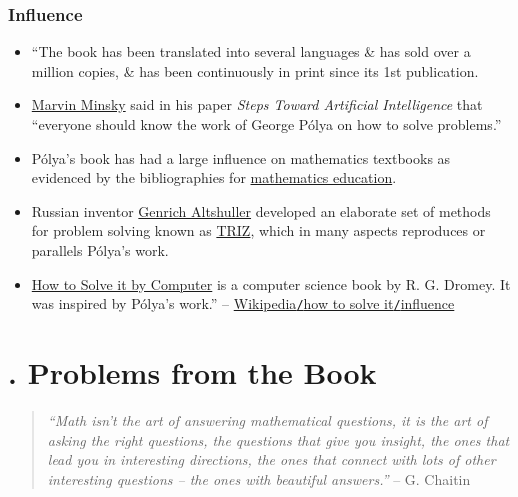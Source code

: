 \documentclass[oneside]{book}
\numberwithin{equation}{section}
\begin{document}
\subsection{Influence}
\begin{itemize}
	\item ``The book has been translated into several languages \& has sold over a million copies, \& has been continuously in print since its 1st publication.
	\item \href{https://en.wikipedia.org/wiki/Marvin_Minsky}{Marvin Minsky} said in his paper \textit{Steps Toward Artificial Intelligence} that ``everyone should know the work of George P\'olya on how to solve problems.''
	\item P\'olya's book has had a large influence on mathematics textbooks as evidenced by the bibliographies for \href{https://en.wikipedia.org/wiki/Mathematics_education}{mathematics education}.
	\item Russian inventor \href{https://en.wikipedia.org/wiki/Genrich_Altshuller}{Genrich Altshuller} developed an elaborate set of methods for problem solving known as \href{https://en.wikipedia.org/wiki/TRIZ}{TRIZ}, which in many aspects reproduces or parallels P\'olya's work.
	\item \href{https://en.wikipedia.org/wiki/How_to_Solve_it_by_Computer}{How to Solve it by Computer} is a computer science book by R. G. Dromey. It was inspired by P\'olya's work.'' -- \href{https://en.wikipedia.org/wiki/How_to_Solve_It#Influence}{Wikipedia\texttt{/}how to solve it\texttt{/}influence}
\end{itemize}


\chapter{\cite{Andreescu_Dospinescu2010}. Problems from the Book}

\begin{quotation}
	\textit{``Math isn't the art of answering mathematical questions, it is the art of asking the right questions, the questions that give you insight, the ones that lead you in interesting directions, the ones that connect with lots of other interesting questions -- the ones with beautiful answers.''} -- G. Chaitin
\end{quotation}
\end{document}
